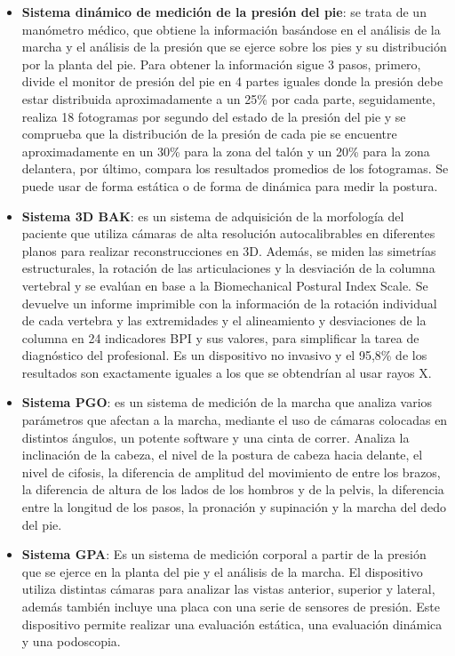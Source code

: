 \begin{itemize}
    \item \textbf{Sistema dinámico de medición de la presión del pie}\cite{SisDinPresionPie}: se trata de un manómetro médico, que obtiene la información basándose en el análisis de la marcha y el análisis de la presión que se ejerce sobre los pies y su distribución por la planta del pie. Para obtener la información sigue 3 pasos, primero, divide el monitor de presión del pie en 4 partes iguales donde la presión debe estar distribuida aproximadamente a un 25\% por cada parte, seguidamente, realiza 18 fotogramas por segundo del estado de la presión del pie y se comprueba que la distribución de la presión de cada pie se encuentre aproximadamente en un 30\% para la zona del talón y un 20\% para la zona delantera, por último, compara los resultados promedios de los fotogramas. Se puede usar de forma estática o de forma de dinámica para medir la postura. 

    \item \textbf{Sistema 3D BAK}\cite{3DBAK}: es un sistema de adquisición de la morfología del paciente que utiliza cámaras de alta resolución autocalibrables en diferentes planos para realizar reconstrucciones en 3D. Además, se miden las simetrías estructurales, la rotación de las articulaciones y la desviación de la columna vertebral y se evalúan en base a la Biomechanical Postural Index Scale. Se devuelve un informe imprimible con la información de la rotación individual de cada vertebra y las extremidades y el alineamiento y desviaciones de la columna en 24 indicadores BPI y sus valores, para simplificar la tarea de diagnóstico del profesional. Es un dispositivo no invasivo y el 95,8\% de los resultados son exactamente iguales a los que se obtendrían al usar rayos X. 

    \item \textbf{Sistema PGO}\cite{SisPGO}: es un sistema de medición de la marcha que analiza varios parámetros que afectan a la marcha, mediante el uso de cámaras colocadas en distintos ángulos, un potente software y una cinta de correr. Analiza la inclinación de la cabeza, el nivel de la postura de cabeza hacia delante, el nivel de cifosis, la diferencia de amplitud del movimiento de entre los brazos, la diferencia de altura de los lados de los hombros y de la pelvis, la diferencia entre la longitud de los pasos, la pronación y supinación y la marcha del dedo del pie. 

    \item \textbf{Sistema GPA}\cite{SisGPA}: Es un sistema de medición corporal a partir de la presión que se ejerce en la planta del pie y el análisis de la marcha. El dispositivo utiliza distintas cámaras para analizar las vistas anterior, superior y lateral, además también incluye una placa con una serie de sensores de presión. Este dispositivo permite realizar una evaluación estática, una evaluación dinámica y una podoscopia.  
\end{itemize}


